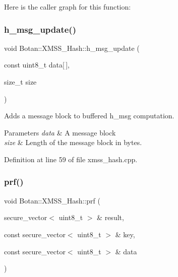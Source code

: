 Here is the caller graph for this function\+:
\mbox{\label{class_botan_1_1_x_m_s_s___hash_a435374ec81321993332a76894fedf220}} 
\subsubsection{\texorpdfstring{h\+\_\+msg\+\_\+update()}{h\_msg\_update()}}
{\footnotesize\ttfamily void Botan\+::\+X\+M\+S\+S\+\_\+\+Hash\+::h\+\_\+msg\+\_\+update (\begin{DoxyParamCaption}\item[{const uint8\+\_\+t}]{data\mbox{[}$\,$\mbox{]},  }\item[{size\+\_\+t}]{size }\end{DoxyParamCaption})}

Adds a message block to buffered h\+\_\+msg computation.


\begin{DoxyParams}{Parameters}
{\em data} & A message block \\
\hline
{\em size} & Length of the message block in bytes. \\
\hline
\end{DoxyParams}


Definition at line 59 of file xmss\+\_\+hash.\+cpp.

\mbox{\label{class_botan_1_1_x_m_s_s___hash_ae2b2924e198c9ce9313b21457235da18}} 
\subsubsection{\texorpdfstring{prf()}{prf()}\hspace{0.1cm}{\footnotesize\ttfamily [1/2]}}
{\footnotesize\ttfamily void Botan\+::\+X\+M\+S\+S\+\_\+\+Hash\+::prf (\begin{DoxyParamCaption}\item[{secure\+\_\+vector$<$ uint8\+\_\+t $>$ \&}]{result,  }\item[{const secure\+\_\+vector$<$ uint8\+\_\+t $>$ \&}]{key,  }\item[{const secure\+\_\+vector$<$ uint8\+\_\+t $>$ \&}]{data }\end{DoxyParamCaption})\hspace{0.3cm}{\ttfamily [inline]}}

